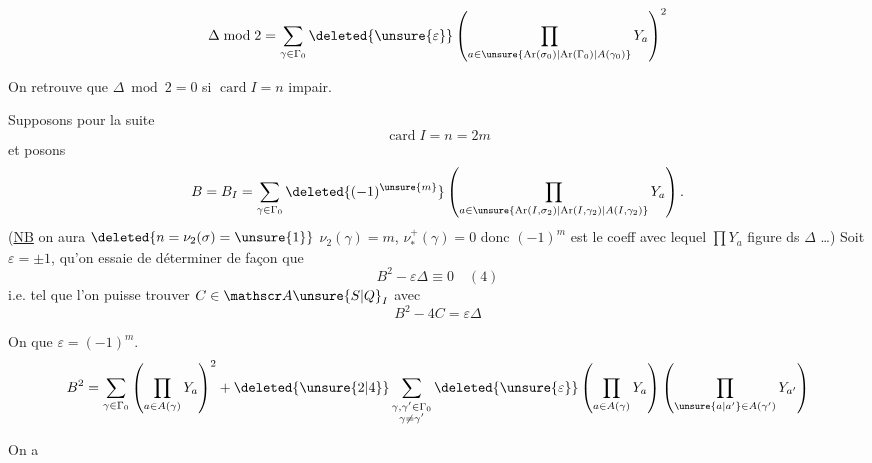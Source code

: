 \[
\Delta\bmod 2=\sum_{\gamma\in\Gamma_0}\deleted{\unsure{\varepsilon}}
\left(\prod_{a\in\unsure{\mathrm{Ar}(\sigma_0)|\mathrm{Ar}(\Gamma_0)|A(\gamma_0)}}Y_a\right)^2
\]

On retrouve que $\Delta\bmod 2=0$ si $\operatorname{card}I=n$ impair.


Supposons pour la suite
\[
\operatorname{card}I=n=2m
\]
 et posons
\[
B=B_I=\sum_{\gamma\in\Gamma_0}\deleted{(-1)^{\unsure{m}}}
\left(\prod_{a\in\unsure{\mathrm{Ar}(I,\sigma_2)|\mathrm{Ar}(I,\gamma_2)|A(I,\gamma_2)}}Y_a\right).
\]
(\uline{NB} on aura $\deleted{n=\nu_2(\sigma)=\unsure{1}}$ $\nu_2(\gamma)=m$, $\nu_*^+(\gamma)=0$ donc $(-1)^m$ est le coeff avec lequel $\prod Y_a$ figure ds $\Delta$ \ldots)  Soit $\varepsilon=\pm1$, qu'on essaie de déterminer de façon que
\[
B^2-\varepsilon\Delta\equiv0\quad(4)
\]
i.e. tel que l'on puisse trouver $C\in\mathscr A\unsure{S|Q}_I$ avec
\[
B^2-4C=\varepsilon\Delta
\]

On   que $\varepsilon=(-1)^m$.
\[
B^2=\sum_{\gamma\in\Gamma_0}\left(\prod_{a\in A(\gamma)}Y_a\right)^2
+\deleted{\unsure{2|4}}\sum_{\substack{\gamma,\gamma'\in\Gamma_0\\\gamma\ne\gamma'}}\deleted{\unsure{\varepsilon}}
\left(\prod_{a\in A(\gamma)}Y_a\right)
\left(\prod_{\unsure{a|a'}\in A(\gamma')}Y_{a'}\right)
\]

On a
